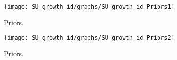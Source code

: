  
\begin{figure}[H]
\centering
\texttt{[image: SU\_growth\_id/graphs/SU\_growth\_id\_Priors1]}
\caption{Priors.}\label{Fig:Priors:1}
\end{figure}
\begin{figure}[H]
\centering
\texttt{[image: SU\_growth\_id/graphs/SU\_growth\_id\_Priors2]}
\caption{Priors.}\label{Fig:Priors:2}
\end{figure}
 
